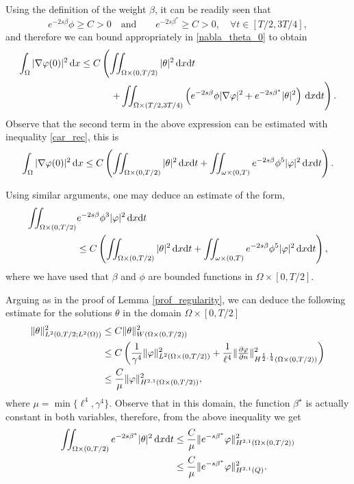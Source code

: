 \documentclass{dcds-bOF}
\theoremstyle{definition}
\def\dx{\,\textnormal{d}x}
\def\dt{\textnormal{d}t}
\begin{document}
Using the definition of the weight $\beta$, it can be readily seen that
%
\begin{equation*}
e^{-2s\beta}\phi\geq C >0 \quad\text{and}\quad \quad  e^{-2s\beta^*}\geq C>0, \quad \forall t\in[T/2,3T/4],
\end{equation*}
%
and therefore we can bound appropriately in \eqref{nabla_theta_0} to obtain
%
\begin{equation*}
\begin{split}
\int_{\Omega}|\nabla\varphi(0)|^2\dx\leq C&\left(\iint_{\Omega\times(0,T/2)}|\theta|^2\dx\dt\right. \\
&\quad \left. +\iint_{\Omega\times(T/2,3T/4)}\left(e^{-2s\beta}\phi|\nabla\varphi|^2+e^{-2s\beta^\star}|\theta|^2\right)\dx\dt\right).
\end{split}
\end{equation*}
%
Observe that the second term in the above expression can be estimated with inequality \eqref{car_rec}, this is
%
\begin{equation}\label{est_h01_theta}
\int_{\Omega}|\nabla\varphi(0)|^2\dx\leq C\left(\iint_{\Omega\times(0,T/2)}|\theta|^2\dx\dt+\iint_{\omega\times(0,T)}e^{-2s\beta}\phi^5|\varphi|^2\dx\dt\right).
\end{equation}

Using similar arguments, one may deduce an estimate of the form,
%
\begin{equation}\label{est_phi_0}
\begin{split}
\iint_{\Omega\times(0,T/2)}&e^{-2s\beta}\phi^3|\varphi|^2\dx\dt\\
&\leq C\left(\iint_{\Omega\times(0,T/2)}|\theta|^2\dx\dt+\iint_{\omega\times(0,T)}e^{-2s\beta}\phi^5|\varphi|^2\dx\dt\right),
\end{split}
\end{equation}
%
where we have used that $\beta$ and $\phi$ are bounded functions in $\Omega\times[0,T/2]$.

Arguing as in the proof of Lemma \ref{prof_regularity}, we can deduce the following estimate for the solutions $\theta$ in the domain $\Omega\times [0,T/2]$
%
\begin{align}\notag
\|\theta\|^2_{L^2(0,T/2;L^2(\Omega))}&\leq C\|\theta\|^2_{W(\Omega\times(0,T/2))}\\ \notag
&\leq C\left(\frac{1}{\gamma^4}\|\varphi\|^2_{L^2(\Omega\times(0,T/2))}+\frac{1}{\ell^4}\|\tfrac{\partial \varphi}{\partial n}\|^2_{H^{\frac12,\frac14}(\Omega\times(0,T/2))}\right) \\ \label{est_theta}
&\leq \frac{C}{\mu}\|\varphi\|_{H^{2,1}(\Omega\times(0,T/2))}^2,
\end{align}
%
where $\mu=\min\{\ell^4,\gamma^4\}$. Observe that in this domain, the function $\beta^\star$ is actually constant in both variables, therefore, from the above inequality we get
%
\begin{align}\notag
\iint_{\Omega\times(0,T/2)}e^{-2s\beta^*}|\theta|^2\dx\dt &\leq \frac{C}{\mu}\|e^{-s\beta^*}\varphi\|_{H^{2,1}(\Omega\times(0,T/2))}^2 \\ \label{est_theta_tme}
&\leq \frac{C}{\mu}\|e^{-s\beta^*}\varphi\|_{H^{2,1}(Q)}^2.
\end{align}
%
\end{document}
